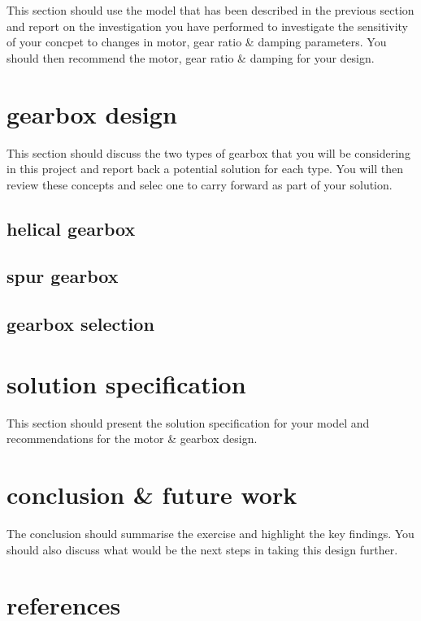 \documentclass[11pt]{article}
\begin{document}
This section should use the model that has been described in the previous section and report on the investigation you have performed to investigate the sensitivity of your concpet to changes in motor, gear ratio \& damping parameters. You should then recommend the motor, gear ratio \& damping for your design.

\section{gearbox design}

This section should discuss the two types of gearbox that you will be considering in this project and report back a potential solution for each type. You will then review these concepts and selec one to carry forward as part of your solution.

\subsection{helical gearbox}

\subsection{spur gearbox}

\subsection{gearbox selection}

\section{solution specification}

This section should present the solution specification for your model and recommendations for the motor \& gearbox design.

\section{conclusion \& future work}

The conclusion should summarise the exercise and highlight the key findings. You should also discuss what would be the next steps in taking this design further.

\section*{references}
\end{document}
